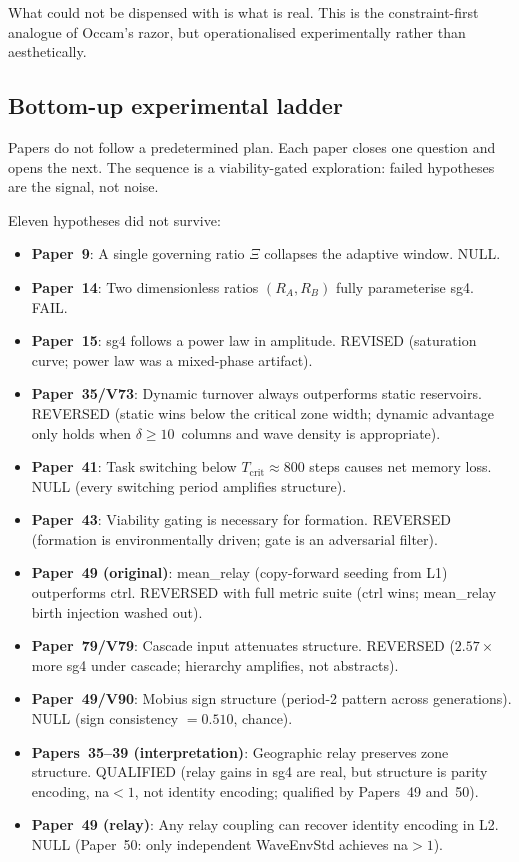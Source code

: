 \documentclass[11pt,a4paper]{article}
\begin{document}
What could not be dispensed with is what is real.
This is the constraint-first analogue of Occam's razor, but operationalised
experimentally rather than aesthetically.

\subsection{Bottom-up experimental ladder}

Papers do not follow a predetermined plan.
Each paper closes one question and opens the next.
The sequence is a viability-gated exploration:
failed hypotheses are the signal, not noise.

Eleven hypotheses did not survive:
\begin{itemize}
  \item \textbf{Paper~9}: A single governing ratio $\Xi$ collapses the adaptive window. NULL.
  \item \textbf{Paper~14}: Two dimensionless ratios $(R_A, R_B)$ fully parameterise sg4. FAIL.
  \item \textbf{Paper~15}: sg4 follows a power law in amplitude. REVISED (saturation curve;
        power law was a mixed-phase artifact).
  \item \textbf{Paper~35/V73}: Dynamic turnover always outperforms static reservoirs. REVERSED
        (static wins below the critical zone width; dynamic advantage only holds when
        $\delta \geq 10$~columns and wave density is appropriate).
  \item \textbf{Paper~41}: Task switching below $T_\mathrm{crit} \approx 800$ steps causes
        net memory loss. NULL (every switching period amplifies structure).
  \item \textbf{Paper~43}: Viability gating is necessary for formation.
        REVERSED (formation is environmentally driven; gate is an adversarial filter).
  \item \textbf{Paper~49 (original)}: mean\_relay (copy-forward seeding from L1) outperforms
        ctrl. REVERSED with full metric suite (ctrl wins; mean\_relay birth injection washed out).
  \item \textbf{Paper~79/V79}: Cascade input attenuates structure. REVERSED
        ($2.57\times$ more sg4 under cascade; hierarchy amplifies, not abstracts).
  \item \textbf{Paper~49/V90}: Mobius sign structure (period-2 pattern across generations).
        NULL (sign consistency $= 0.510$, chance).
  \item \textbf{Papers~35--39 (interpretation)}: Geographic relay preserves zone structure.
        QUALIFIED (relay gains in sg4 are real, but structure is parity encoding, na$<1$,
        not identity encoding; qualified by Papers~49 and~50).
  \item \textbf{Paper~49 (relay)}: Any relay coupling can recover identity encoding in L2.
        NULL (Paper~50: only independent WaveEnvStd achieves na$>1$).
\end{itemize}
\end{document}
